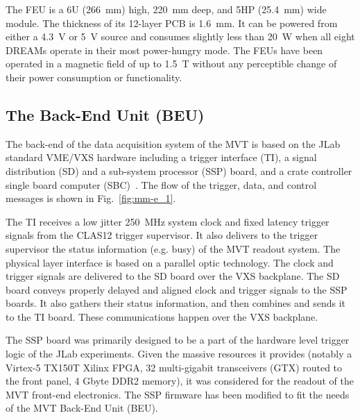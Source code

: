 The FEU is a 6U (266~mm) high, 220~mm deep, and 5HP (25.4~mm) wide module. The thickness of its 12-layer PCB is 1.6~mm. It
can be powered from either a 4.3~V or 5~V source and consumes slightly less than 20~W when all eight DREAMs operate in their
most power-hungry mode. The FEUs have been operated in a magnetic field of up to 1.5~T without any perceptible change of their
power consumption or functionality.

\subsection{The Back-End Unit (BEU)}

The back-end of the data acquisition system of the MVT is based on the JLab standard VME/VXS hardware including a trigger
interface (TI), a signal distribution (SD) and a sub-system processor (SSP) board, and a crate controller single board computer
(SBC)~\cite{daq-nim}. The flow of the trigger, data, and control messages is shown in Fig.~\ref{fig:mm-e_1}. 

% 

The TI receives a low jitter 250~MHz system clock and fixed latency trigger signals from the CLAS12 trigger supervisor. It
also delivers to the trigger supervisor the status information (e.g. busy) of the MVT readout system. The physical layer interface
is based on a parallel optic technology. The clock and trigger signals are delivered to the SD board over the VXS backplane. The
SD board conveys properly delayed and aligned clock and trigger signals to the SSP boards. It also gathers their status
information, and then combines and sends it to the TI board. These communications happen over the VXS backplane.

The SSP board was primarily designed to be a part of the hardware level trigger logic of the JLab experiments. Given the
massive resources it provides (notably a Virtex-5 TX150T Xilinx FPGA, 32 multi-gigabit transceivers (GTX) routed to the
front panel, 4 Gbyte DDR2 memory), it was considered for the readout of the MVT front-end electronics. The SSP firmware
has been modified to fit the needs of the MVT Back-End Unit (BEU).

